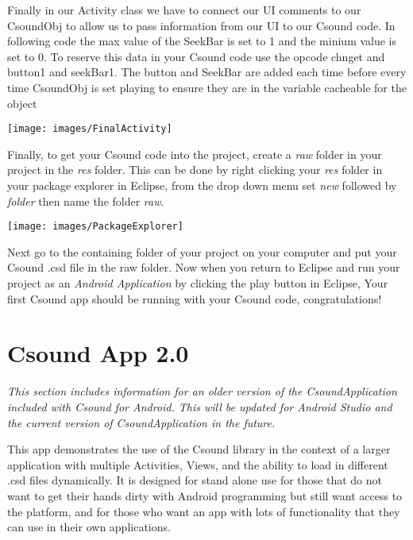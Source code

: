 \documentclass[11pt]{article}
\begin{document}
Finally in our Activity class we have to connect our UI comments to our CsoundObj to allow us to pass information from our UI to our Csound code. In following code the max value of the SeekBar is set to 1 and the minium value is set to 0. To reserve this data in your Csound code use the opcode chnget and button1 and seekBar1. The button and SeekBar are added each time before every time CsoundObj is set playing to ensure they are in the variable cacheable for the object

\begin{center}
\texttt{[image: images/FinalActivity]}
\end{center}

Finally, to get your Csound code into the project, create a \textit{raw} folder in your project in the \textit{res} folder. This can be done by right clicking your  \textit{res} folder in your package explorer in Eclipse, from the drop down menu set \textit{new} followed by \textit{folder} then name the folder  \textit{raw}. 

\begin{center}
\texttt{[image: images/PackageExplorer]}
\end{center}

Next go to the containing folder of your project on your computer and put your Csound .csd file in the raw folder. Now when you return to Eclipse and run your project as an \textit{Android Application} by clicking the play button in Eclipse, Your first Csound app should be running with your Csound code, congratulations!


\section{Csound App 2.0}

\emph{This section includes information for an older version of the CsoundApplication included with Csound for Android. This will be updated for Android Studio and the current version of CsoundApplication in the future.} 

This app demonstrates the use of the Csound library in the context of a larger application with multiple Activities, Views, and the ability to load in different .csd files dynamically. It is designed for stand alone use for those that do not want to get their hands dirty with Android programming but still want access to the platform, and for those who want an app with lots of functionality that they can use in their own applications. 
\end{document}
